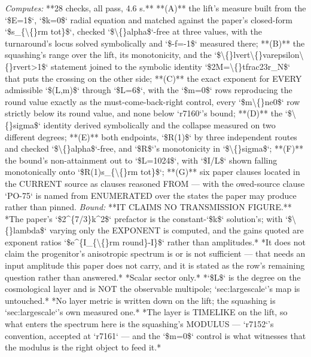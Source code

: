 \begin{description}
\emph{Computes:} **28 checks, all pass, 4.6 s.** **(A)** the lift's measure built from the `\$E=1\$`, `\$k=0\$` radial equation and matched against the paper's closed-form `\$s\_\{\textbackslash\{\}rm tot\}\$`, checked `\$\textbackslash\{\}alpha\$`-free at three values, with the turnaround's locus solved symbolically and `\$-f=-1\$` measured there; **(B)** the squashing's range over the lift, its monotonicity, and the `\$\textbackslash\{\}lvert\textbackslash\{\}varepsilon\textbackslash\{\}rvert>1\$` statement joined to the symbolic identity `\$2M=\textbackslash\{\}tfrac23r\_N\$` that puts the crossing on the other side; **(C)** the exact exponent for EVERY admissible `\$(L,m)\$` through `\$L=6\$`, with the `\$m=0\$` rows reproducing the round value exactly as the must-come-back-right control, every `\$m\textbackslash\{\}ne0\$` row strictly below its round value, and none below `r7160`'s bound; **(D)** the `\$\textbackslash\{\}sigma\$` identity derived symbolically and the collapse measured on two different degrees; **(E)** both endpoints, `\$R(1)\$` by three independent routes and checked `\$\textbackslash\{\}alpha\$`-free, and `\$R\$`'s monotonicity in `\$\textbackslash\{\}sigma\$`; **(F)** the bound's non-attainment out to `\$L=1024\$`, with `\$I/L\$` shown falling monotonically onto `\$R(1)s\_\{\textbackslash\{\}rm tot\}\$`; **(G)** six paper clauses located in the CURRENT source as clauses reasoned FROM --- with the owed-source clause `PO-75` is named from ENUMERATED over the states the paper may produce rather than pinned.
 \emph{Bound:}  **IT CLAIMS NO TRANSMISSION FIGURE.** *The paper's `\$2\textasciicircum{}\{7/3\}k\textasciicircum{}2\$` prefactor is the constant-`\$k\$` solution's; with `\$\textbackslash\{\}lambda\$` varying only the EXPONENT is computed, and the gains quoted are exponent ratios `\$e\textasciicircum{}\{I\_\{\textbackslash\{\}rm round\}-I\}\$` rather than amplitudes.*  *It does not claim the progenitor's anisotropic spectrum is or is not sufficient --- that needs an input amplitude this paper does not carry, and it is stated as the row's remaining question rather than answered.*  *Scalar sector only.*  *`\$L\$` is the degree on the cosmological layer and is NOT the observable multipole; `sec:largescale`'s map is untouched.*  *No layer metric is written down on the lift; the squashing is `sec:largescale`'s own measured one.*  *The layer is TIMELIKE on the lift, so what enters the spectrum here is the squashing's MODULUS --- `r7152`'s convention, accepted at `r7161` --- and the `\$m=0\$` control is what witnesses that the modulus is the right object to feed it.*

\end{description}
